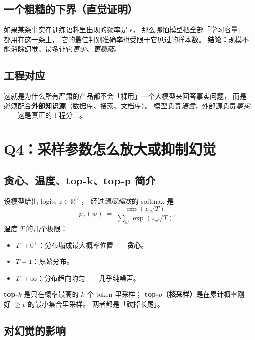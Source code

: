 \documentclass[11pt,a4paper]{ctexart}
\begin{document}
\subsection*{一个粗糙的下界（直觉证明）}

如果某条事实在训练语料里出现的频率是 $\epsilon$，
那么哪怕模型把全部「学习容量」都用在这一条上，
它的最佳判别准确率也受限于它见过的样本数。
\textbf{结论：}规模不能消除幻觉，最多让它\emph{更少、更隐蔽}。

\subsection{工程对应}

\begin{engbox}
这就是为什么所有严肃的产品都不会「裸用」一个大模型来回答事实问题，
而是必须配合\textbf{外部知识源}（数据库、搜索、文档库）。
模型负责\emph{语言}，外部源负责\emph{事实}——这是真正的工程分工。
\end{engbox}

\section{Q4：采样参数怎么放大或抑制幻觉}

\subsection{贪心、温度、top-k、top-p 简介}

设模型给出 logits $z \in \mathbb{R}^{|\mathcal{V}|}$，
经过\emph{温度缩放}的 softmax 是
\[
  p_T(w) \;=\; \frac{\exp(z_w / T)}{\sum_{w'} \exp(z_{w'} / T)}.
\]
温度 $T$ 的几个极限：
\begin{itemize}
  \item $T \to 0^+$：分布塌成最大概率位置——\textbf{贪心}。
  \item $T = 1$：原始分布。
  \item $T \to \infty$：分布趋向均匀——几乎纯噪声。
\end{itemize}

\textbf{top-$k$} 是只在概率最高的 $k$ 个 token 里采样；
\textbf{top-$p$（核采样）}是在累计概率刚好 $\ge p$ 的最小集合里采样。
两者都是「砍掉长尾」。

\subsection{对幻觉的影响}
\end{document}

